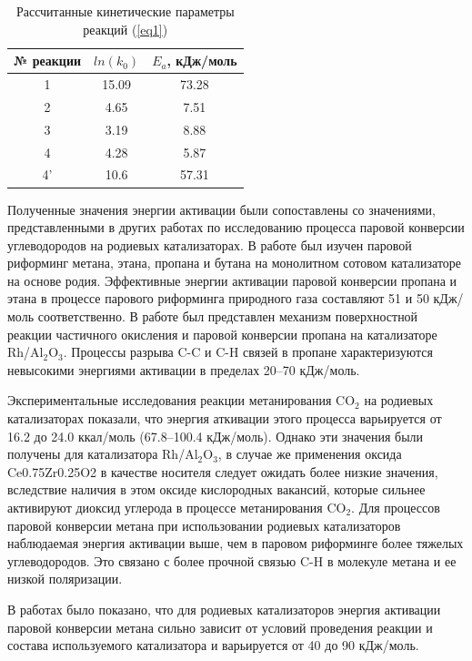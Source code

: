 \documentclass{cmi1}
\begin{document}
\begin{table}[h]
\noindent
\caption{Рассчитанные кинетические параметры реакций (\ref{eq1})}
\label{tab:kinetik}
\centering
\begin{tabular}{|c|c|c|}
\hline
\textbf{№ реакции} & \textbf{$ln(k_0)$} & \textbf{$E_a$, кДж/моль} \\
\hline
1   & 15.09  & 73.28 \\
2   & 4.65   & 7.51 \\
3   & 3.19   & 8.88 \\
4   & 4.28   & 5.87 \\
4'  & 10.6   & 57.31 \\
\hline
\end{tabular}
\end{table}
Полученные значения энергии активации были сопоставлены со значениями, представленными в других работах по исследованию процесса паровой конверсии углеводородов на родиевых катализаторах.
В работе  был изучен паровой риформинг метана, этана, пропана и бутана на монолитном сотовом катализаторе на основе родия. Эффективные энергии активации паровой конверсии пропана и этана в процессе парового риформинга природного газа составляют 51 и 50 кДж/моль соответственно.
В работе  был представлен механизм поверхностной реакции частичного окисления и паровой конверсии пропана на катализаторе Rh/Al$_{2}$O$_{3}$. Процессы разрыва C-C и C-H связей в пропане характеризуются невысокими энергиями активации в пределах 20--70 кДж/моль.

Экспериментальные исследования реакции метанирования CO$_{2}$ на родиевых катализаторах  показали, что энергия аткивации этого процесса варьируется от 16.2 до 24.0 ккал/моль (67.8--100.4 кДж/моль). Однако эти значения были получены для катализатора Rh/Al$_{2}$O$_{3}$, в случае же применения оксида Ce0.75Zr0.25O2 в качестве носителя следует ожидать более низкие значения, вследствие наличия в этом оксиде кислородных вакансий, которые сильнее активируют диоксид углерода в процессе метанирования CO$_{2}$. Для процессов паровой конверсии метана при использовании родиевых катализаторов наблюдаемая энергия активации выше, чем в паровом риформинге более тяжелых углеводородов. Это связано с более прочной связью C-H в молекуле метана и ее низкой поляризации.

В работах  было показано, что для родиевых катализаторов энергия активации паровой конверсии метана сильно зависит от условий проведения реакции и состава используемого катализатора и варьируется от 40 до 90 кДж/моль.
\end{document}
